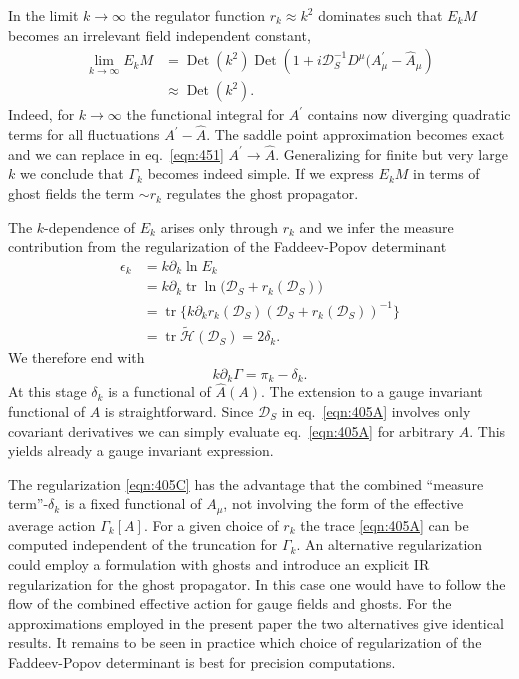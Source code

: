 \documentclass[twocolumn,aps,prd,amsmath,amssymb,preprintnumbers,longbibliography]{revtex4-1}
\numberwithin{equation}{section}
\DeclareMathOperator{\tr}{tr}
\DeclareMathOperator{\Det}{Det}
\newenvironment{alignedeqn}{\begin{equation}\begin{aligned}}{\end{aligned}\end{equation}\ignorespacesafterend}
\begin{document}
In the limit $k\to \infty$ the regulator function $r_k\approx k^2$ dominates such that $E_kM$ becomes an irrelevant field independent constant,
\begin{alignedeqn}\label{eqn:405E}
	\lim_{k \to \infty} E_k M
	&= \Det(k^2)\Det\left(1 + i\mathcal{D}^{-1}_S D^\mu(A_\mu^\prime - \hat{A}_\mu \right)\\
	&\approx \Det(k^2).
\end{alignedeqn}
Indeed, for $k\rightarrow\infty$ the functional integral for $A^\prime$ contains now diverging quadratic terms for all fluctuations $A^\prime - \hat{A}$. The saddle point approximation becomes exact and we can replace in eq.~\eqref{eqn:451} $A^\prime\to \hat{A}$. Generalizing for finite but very large $k$ we conclude that
$\Gamma_k$ becomes indeed simple. If we express $E_kM$ in terms of ghost fields the term $\sim r_k$ regulates the ghost propagator.


The $k$-dependence of $E_k$ arises only through $r_k$ and we infer the measure contribution from the regularization of the Faddeev-Popov determinant
\begin{alignedeqn}\label{eqn:452A}
	\epsilon_k
	&= k\partial_k \ln E_k\\
	&= k\partial_k \tr\ln \bigl(\mathcal{D}_S + r_k(\mathcal{D}_S)\bigr)\\
	&= \tr\bigl\{k\partial_k r_k(\mathcal{D}_S)(\mathcal{D}_S + r_k(\mathcal{D}_S))^{-1}\bigr\}\\
	&= \tr\tilde{\mathcal{H}}(\mathcal{D}_S)
	= 2 \delta_k.
\end{alignedeqn}
We therefore end with
\begin{equation}\label{eqn:452B}
	k \partial_k \Gamma
	= \pi_k - \delta_k.
\end{equation}
At this stage $\delta_{k}$ is a functional of $\hat{A}(A)$. The extension to a gauge invariant functional of $A$ is straightforward. Since $\mathcal{D}_{S}$ in eq.~\eqref{eqn:405A} involves only covariant derivatives we can simply evaluate eq.~\eqref{eqn:405A} for arbitrary $A$. This yields already a gauge invariant expression.

The regularization \eqref{eqn:405C} has the advantage that the combined ``measure term''-$\delta_k$ is a fixed functional of $A_\mu$, not involving the form of the effective average action $\Gamma_k[A]$. For a given choice of $r_k$ the trace \eqref{eqn:405A} can be computed independent of the truncation for $\Gamma_k$. An alternative regularization could employ a formulation with ghosts and introduce an explicit IR regularization for the ghost propagator. In this case one would have to follow the flow of the combined effective action for gauge fields and ghosts. For the approximations employed in the present paper the two alternatives give identical results. It remains to be seen in practice which choice of regularization of the Faddeev-Popov determinant is best for precision computations.
\end{document}
